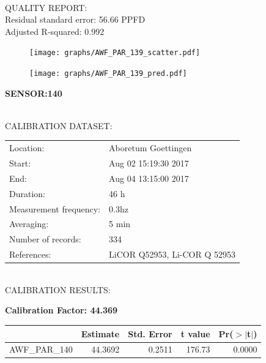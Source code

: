 \documentclass[oneside]{report}
\begin{document}
\hrulefill\\
QUALITY REPORT:\\
Residual standard error: 56.66 PPFD\\
Adjusted R-squared: 0.992



\begin{figure}[H]
  \centering
  \texttt{[image: graphs/AWF\_PAR\_139\_scatter.pdf]}
\end{figure}




\begin{figure}[H]
  \centering
  \texttt{[image: graphs/AWF\_PAR\_139\_pred.pdf]}
\end{figure}

\pagebreak


\begin{center}
\large{\textbf{SENSOR:140}}\\
\end{center}

\hrulefill\\
CALIBRATION DATASET:\\
\begin{table}[h!]
  \centering
  \label{tab:table1}
  \begin{tabular}{ll}
    Location: & Aboretum Goettingen\\ 
    
    
    Start:  & Aug 02 15:19:30 2017 \\
    End:   & Aug 04 13:15:00 2017\\ 
    Duration: & 46 h\\
    Measurement frequency: & 0.3hz\\
    Averaging:  &5 min\\
    Number of records: & 334 \\
    References: & LiCOR Q52953, Li-COR Q 52953 \\
  \end{tabular}
\end{table}

\hrulefill\\
CALIBRATION RESULTS:\\


\begin{center}
\textbf{\large{Calibration Factor: 44.369}}\\
\end{center}
\begin{table}[ht]
\centering
\begin{tabular}{rrrrr}
  \hline
 & Estimate & Std. Error & t value & Pr($>$$|$t$|$) \\ 
  \hline
AWF\_PAR\_140 & 44.3692 & 0.2511 & 176.73 & 0.0000 \\ 
   \hline
\end{tabular}
\end{table}
\end{document}
